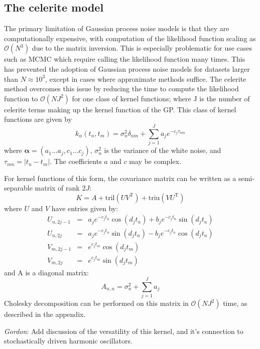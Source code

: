 \documentclass[modern]{aastex62}
\newcommand{\todo}[3]{{\color{#2}\emph{#1}: #3}}
\newcommand{\gordontodo}[1]{\todo{Gordon}{red}{#1}}
\newcommand{\project}[1]{\textsf{#1}}
\newcommand{\celerite}{\project{celerite }}
\newcommand{\bvec}[1]{{\ensuremath{\boldsymbol{#1}}}}
\newcommand{\T}{\ensuremath{\mathrm{T}}}
\begin{document}
	\subsection{The \celerite model}
		The primary limitation of Gaussian process noise models is that they are computationally expensive, with computation of the likelihood function scaling as 
		$\mathcal{O}(N^3)$ due to the matrix inversion. This is especially problematic for use cases such as MCMC which require calling the likelihood function many 
		times. This has prevented the adoption of Gaussian process noise models for datasets larger than $N \approx 10^3$, except in cases where approximate 
		methods suffice. The \celerite method overcomes this issue by reducing the time to compute the likelihood function to $\mathcal{O}(NJ^2)$ for one 
		class of kernel functions; where J is the number of \celerite terms making up the kernel function of the GP. This class of kernel functions are given by 
		\begin{equation}
			k_\alpha(t_n, t_m) = \sigma_n^2 \delta_{nm} + \sum_{j=1}^J a_j e^{-c_j\tau_{nm}}
		\end{equation}
		where $\bvec{\alpha} = (a_1...a_j, c_1...c_j)$, $\sigma_n^2$ is the variance of the white noise, and $\tau_{nm} = |t_n-t_m|$. 
		The coefficients $a$ and $c$ may be complex.
	
		For kernel functions of this form, the covariance matrix can be written as a semi-separable matrix of rank $2J$:
		\begin{equation}
			K = A + \mathrm{tril}(UV^\T) + \mathrm{triu}(VU^\T)
		\end{equation}
		where $U$ and $V$ have entries given by: 
		\begin{eqnarray}
			U_{n, 2j-1} &=& a_je^{-c_jt_n}\cos(d_jt_n) + b_je^{-c_jt_n}\sin(d_jt_n) \nonumber \\
			U_{n, 2j} &=& a_je^{-c_jt_n}\sin(d_jt_n) - b_je^{-c_jt_n}\cos(d_jt_n) \nonumber \\
			V_{m, 2j-1} &=& e^{c_jt_m}\cos(d_jt_m) \nonumber \\
			V_{m, 2j} &=& e^{c_jt_m}\sin(d_jt_m)
		\end{eqnarray}
		and A is a diagonal matrix:
		\begin{equation}
			A_{n,n} = \sigma_n^2 + \sum_{j=1}^Ja_j
		\end{equation}
		Cholesky decomposition can be performed on this matrix in $\mathcal{O}(NJ^2)$ time, as described in the appendix. 
		 
		\gordontodo{Add discussion of the versatility of this kernel, and it's connection to stochastically driven harmonic oscillators.}
		
\end{document}
